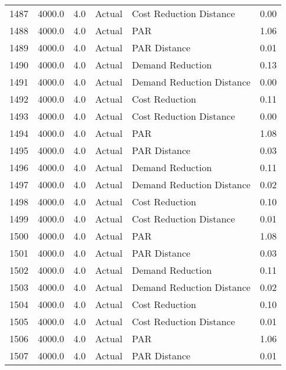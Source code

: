 \begin{longtable}{lrrllr}
1487 &       4000.0 &     4.0 &         Actual &    Cost Reduction Distance &   0.00 \\
1488 &       4000.0 &     4.0 &         Actual &                        PAR &   1.06 \\
1489 &       4000.0 &     4.0 &         Actual &               PAR Distance &   0.01 \\
1490 &       4000.0 &     4.0 &         Actual &           Demand Reduction &   0.13 \\
1491 &       4000.0 &     4.0 &         Actual &  Demand Reduction Distance &   0.00 \\
1492 &       4000.0 &     4.0 &         Actual &             Cost Reduction &   0.11 \\
1493 &       4000.0 &     4.0 &         Actual &    Cost Reduction Distance &   0.00 \\
1494 &       4000.0 &     4.0 &         Actual &                        PAR &   1.08 \\
1495 &       4000.0 &     4.0 &         Actual &               PAR Distance &   0.03 \\
1496 &       4000.0 &     4.0 &         Actual &           Demand Reduction &   0.11 \\
1497 &       4000.0 &     4.0 &         Actual &  Demand Reduction Distance &   0.02 \\
1498 &       4000.0 &     4.0 &         Actual &             Cost Reduction &   0.10 \\
1499 &       4000.0 &     4.0 &         Actual &    Cost Reduction Distance &   0.01 \\
1500 &       4000.0 &     4.0 &         Actual &                        PAR &   1.08 \\
1501 &       4000.0 &     4.0 &         Actual &               PAR Distance &   0.03 \\
1502 &       4000.0 &     4.0 &         Actual &           Demand Reduction &   0.11 \\
1503 &       4000.0 &     4.0 &         Actual &  Demand Reduction Distance &   0.02 \\
1504 &       4000.0 &     4.0 &         Actual &             Cost Reduction &   0.10 \\
1505 &       4000.0 &     4.0 &         Actual &    Cost Reduction Distance &   0.01 \\
1506 &       4000.0 &     4.0 &         Actual &                        PAR &   1.06 \\
1507 &       4000.0 &     4.0 &         Actual &               PAR Distance &   0.01 \\

\end{longtable}
